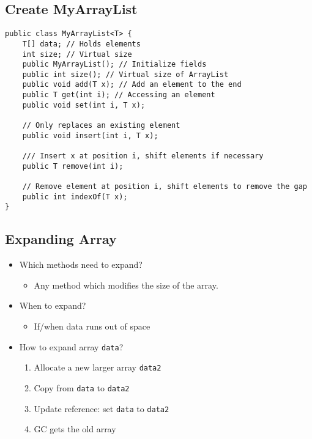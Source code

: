 \documentclass[10pt]{article}
\begin{document}
\subsection*{Create MyArrayList}
\begin{verbatim}
public class MyArrayList<T> {
    T[] data; // Holds elements
    int size; // Virtual size
    public MyArrayList(); // Initialize fields
    public int size(); // Virtual size of ArrayList
    public void add(T x); // Add an element to the end
    public T get(int i); // Accessing an element
    public void set(int i, T x);
    
    // Only replaces an existing element
    public void insert(int i, T x);
    
    /// Insert x at position i, shift elements if necessary
    public T remove(int i);
    
    // Remove element at position i, shift elements to remove the gap
    public int indexOf(T x);
}
\end{verbatim}

\subsection*{Expanding Array}
\begin{itemize}
    \item Which methods need to expand?
    \begin{itemize}
        \item Any method which modifies the size of the array.
    \end{itemize}
    \item When to expand?
    \begin{itemize}
        \item If/when data runs out of space
    \end{itemize}
    \item How to expand array \texttt{data}?
    \begin{enumerate}
        \item Allocate a new larger array \texttt{data2}
        \item Copy from \texttt{data} to \texttt{data2}
        \item Update reference: set \texttt{data} to \texttt{data2}
        \item GC gets the old array
    \end{enumerate}
\end{itemize}
\end{document}
